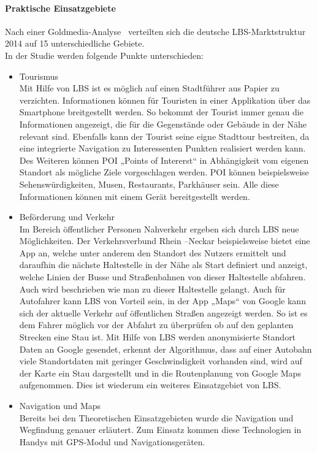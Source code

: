 \paragraph{Praktische Einsatzgebiete}
Nach einer Goldmedia-Analyse~\cite[S.9]{goldmedia:lbs} verteilten sich die deutsche LBS-Marktstruktur 2014 auf 15 unterschiedliche Gebiete.\\
In der Studie werden folgende Punkte unterschieden:
\begin{itemize}
	\item Tourismus\\
	Mit Hilfe von LBS ist es möglich auf einen Stadtführer aus Papier zu verzichten. Informationen können für Touristen in einer Applikation über das Smartphone breitgestellt werden. So bekommt der Tourist immer genau die Informationen angezeigt, die für die Gegenstände oder Gebäude in der Nähe relevant sind. Ebenfalls kann der Tourist seine eigne Stadttour bestreiten, da eine integrierte Navigation zu Interessenten Punkten realisiert werden kann. Des Weiteren können POI „Points of Intererst“ in Abhängigkeit vom eigenen Standort als mögliche Ziele vorgeschlagen werden. POI können beispielsweise Sehenswürdigkeiten, Musen, Restaurants, Parkhäuser sein.
Alle diese Informationen können mit einem Gerät bereitgestellt werden.

	\item Beförderung und Verkehr\\
	Im Bereich öffentlicher Personen Nahverkehr ergeben sich durch LBS neue Möglichkeiten. Der Verkehrsverbund Rhein –Neckar beispielsweise bietet eine App an, welche unter anderem den Standort des Nutzers ermittelt und daraufhin die nächste Haltestelle in der Nähe als Start definiert und anzeigt, welche Linien der Busse und Straßenbahnen von dieser Haltestelle abfahren. Auch wird beschrieben wie man zu dieser Haltestelle gelangt.
Auch für Autofahrer kann LBS von Vorteil sein, in der App „Maps“ von Google kann sich der aktuelle Verkehr auf öffentlichen Straßen angezeigt werden. So ist es dem Fahrer möglich vor der Abfahrt zu überprüfen ob auf den geplanten Strecken eine Stau ist. Mit Hilfe von LBS werden anonymisierte Standort Daten an Google gesendet, erkennt der Algorithmus, dass auf einer Autobahn viele Standortdaten mit geringer Geschwindigkeit vorhanden sind, wird auf der Karte ein Stau dargestellt und in die Routenplanung von Google Maps aufgenommen. Dies ist wiederum ein weiteres Einsatzgebiet von LBS. \cite{StauWarnung}

	
	\item Navigation und Maps\\
	Bereits bei den Theoretischen Einsatzgebieten wurde die Navigation und Wegfindung genauer erläutert. Zum Einsatz kommen diese Technologien in Handys mit GPS-Modul und Navigationsgeräten. 
	

\end{itemize}
